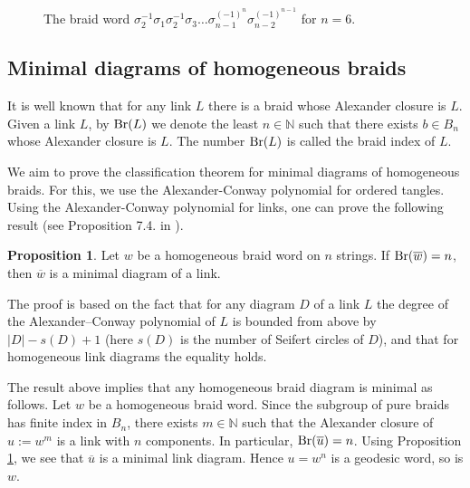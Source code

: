 \documentclass[11pt]{amsart}
\theoremstyle{plain}
\theoremstyle{definition}
\newtheorem{Proposition}[Theorem]{Proposition}
\numberwithin{equation}{section}
\begin{document}
\begin{figure}[H]
\centering
{}
\caption{The braid word $\sigma_2^{-1}\sigma_1\sigma_2^{-1}\sigma_3\ldots \sigma_{n-1}^{(-1)^n} \sigma_{n-2}^{(-1)^{n-1}}$ for $n=6$.}\label{UsefulBraid}
\end{figure}



\subsection{Minimal diagrams of homogeneous braids}

It is well known that for any link $L$ there is a braid whose Alexander closure is $L$. Given a link $L$, by ${\rm Br}(L)$ we denote the least $n \in \mathbb{N}$ such that there exists $b \in B_n$ whose Alexander closure is $L$. The number ${\rm Br}(L)$ is called the braid index of $L$.

We aim to prove the classification theorem for minimal diagrams of homogeneous braids. For this, we use the Alexander-Conway polynomial for ordered tangles. Using the Alexander-Conway polynomial for links, one can prove the following result (see Proposition 7.4. in \cite{MurasugiA}).

\begin{Proposition}\label{MurasugiTheorem}
Let $w$ be a homogeneous braid word on $n$ strings. If ${\rm Br}(\overline{w}) = n$, then $\overline{w}$ is a minimal diagram of a link.
\end{Proposition}

The proof is based on the fact that for any diagram $D$ of a link $L$ the degree of the Alexander--Conway polynomial of $L$ is bounded from above by $|D|-s(D)+1$ (here $s(D)$ is the number of Seifert circles of $D$), and that for homogeneous link diagrams the equality holds.

The result above implies that any homogeneous braid diagram is minimal as follows. Let $w$ be a homogeneous braid word. Since the subgroup of pure braids has finite index in $B_n$, there exists $m \in \mathbb{N}$ such that the Alexander closure of $u := w^m$ is a link with $n$ components. In particular, ${\rm Br}(\overline{u}) = n$. Using Proposition \ref{MurasugiTheorem}, we see that $\overline{u}$ is a minimal link diagram. Hence $u = w^n$ is a geodesic word, so is $w$.
\end{document}
